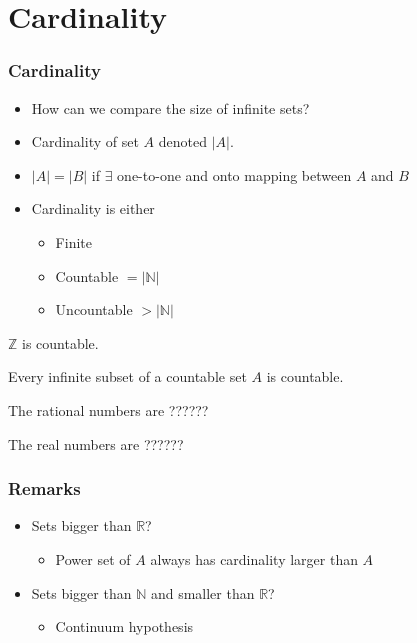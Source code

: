 \documentclass[compress]{beamer}
\begin{document}
\section{Cardinality \label{s:card}}

\begin{frame}
  \frametitle{Cardinality}
  \begin{itemize}
  \item How can we compare the size of infinite sets?
  \item Cardinality of set $A$ denoted $|A|$. 
  \item $|A| = |B|$ if $\exists$ one-to-one and onto mapping between
    $A$ and $B$
  \item Cardinality is either
    \begin{itemize}
    \item Finite
    \item Countable $=|\mathbb{N}|$
    \item Uncountable $>|\mathbb{N}|$ 
    \end{itemize}
  \end{itemize}
\end{frame}

\begin{frame}
  \begin{lemma}
    $\mathbb{Z}$ is countable. 
  \end{lemma}
\end{frame}  

\begin{frame}
  \begin{theorem} \label{thm:countsubset}
    Every infinite subset of a countable set $A$ is countable.
  \end{theorem}
\end{frame}

\begin{frame}
  \begin{theorem}
    The rational numbers are ??????
  \end{theorem}
\end{frame}

\begin{frame}
  \begin{theorem}
    The real numbers are ??????
  \end{theorem}
\end{frame}

\begin{frame}
  \frametitle{Remarks}
  \begin{itemize}
  \item Sets bigger than $\mathbb{R}$?
    \begin{itemize}
    \item Power set of $A$ always has cardinality larger than $A$
    \end{itemize}
  \item Sets bigger than $\mathbb{N}$ and smaller than $\mathbb{R}$?
    \begin{itemize}
    \item Continuum hypothesis 
    \end{itemize}
  \end{itemize}
\end{frame}
\end{document}
